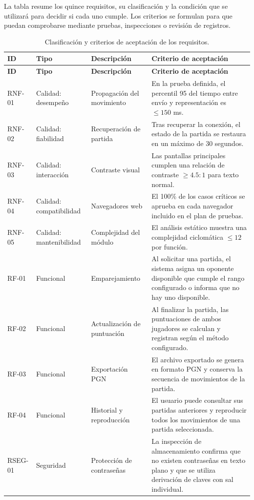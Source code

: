 \documentclass[12pt,a4paper]{article}
\begin{document}
La tabla resume los quince requisitos, su clasificación y la condición que se utilizará para decidir si cada uno cumple. Los criterios se formulan para que puedan comprobarse mediante pruebas, inspecciones o revisión de registros.

\small
\begin{longtable}{p{1.35cm}p{2.35cm}p{5.1cm}p{6cm}}
\caption{Clasificación y criterios de aceptación de los requisitos.}
\label{tab:requisitos}\\
\toprule
\textbf{ID} & \textbf{Tipo} & \textbf{Descripción} & \textbf{Criterio de aceptación}\\
\midrule
\endfirsthead
\toprule
\textbf{ID} & \textbf{Tipo} & \textbf{Descripción} & \textbf{Criterio de aceptación}\\
\midrule
\endhead
RNF-01 & Calidad: desempeño & Propagación del movimiento & En la prueba definida, el percentil 95 del tiempo entre envío y representación es $\leq 150$ ms.\\
RNF-02 & Calidad: fiabilidad & Recuperación de partida & Tras recuperar la conexión, el estado de la partida se restaura en un máximo de 30 segundos.\\
RNF-03 & Calidad: interacción & Contraste visual & Las pantallas principales cumplen una relación de contraste $\geq 4.5:1$ para texto normal.\\
RNF-04 & Calidad: compatibilidad & Navegadores web & El 100\% de los casos críticos se aprueba en cada navegador incluido en el plan de pruebas.\\
RNF-05 & Calidad: mantenibilidad & Complejidad del módulo & El análisis estático muestra una complejidad ciclomática $\leq 12$ por función.\\
RF-01 & Funcional & Emparejamiento & Al solicitar una partida, el sistema asigna un oponente disponible que cumple el rango configurado o informa que no hay uno disponible.\\
RF-02 & Funcional & Actualización de puntuación & Al finalizar la partida, las puntuaciones de ambos jugadores se calculan y registran según el método configurado.\\
RF-03 & Funcional & Exportación PGN & El archivo exportado se genera en formato PGN y conserva la secuencia de movimientos de la partida.\\
RF-04 & Funcional & Historial y reproducción & El usuario puede consultar sus partidas anteriores y reproducir todos los movimientos de una partida seleccionada.\\
RSEG-01 & Seguridad & Protección de contraseñas & La inspección de almacenamiento confirma que no existen contraseñas en texto plano y que se utiliza derivación de claves con sal individual.\\

\end{longtable}
\end{document}

